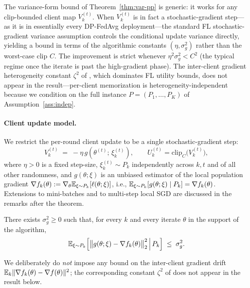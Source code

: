 The variance-form bound of Theorem~\ref{thm:var-pp} is generic: it works for any clip-bounded client map \(V_k^{(t)}\). When \(V_k^{(t)}\) is in fact a stochastic-gradient step---as it is in essentially every DP-FedAvg deployment---the standard FL stochastic-gradient variance assumption \citep[Assumption~3]{Bornstein2022SWIFT} controls the conditional update variance directly, yielding a bound in terms of the algorithmic constants \((\eta,\sigma_g^2)\) rather than the worst-case clip \(C\). The improvement is strict whenever \(\eta^2\sigma_g^2<C^2\) (the typical regime once the iterate is past the high-gradient phase). The inter-client gradient heterogeneity constant \(\zeta^2\) of \citet[Assumption~3]{Bornstein2022SWIFT}, which dominates FL utility bounds, does not appear in the result---per-client memorization is heterogeneity-independent because we condition on the full instance \(P=(P_1,\dots,P_K)\) of Assumption~\ref{ass:indep}.

\paragraph{Client update model.} We restrict the per-round client update to be a single stochastic-gradient step:
\begin{equation}\label{eq:sg-update}
V_k^{(t)} \;=\; -\eta\,g\!\left(\theta^{(t)};\,\xi_k^{(t)}\right),\qquad U_k^{(t)}=\mathrm{clip}_C\bigl(V_k^{(t)}\bigr),
\end{equation}
where \(\eta>0\) is a fixed step-size, \(\xi_k^{(t)}\sim P_k\) independently across \(k,t\) and of all other randomness, and \(g(\theta;\xi)\) is an unbiased estimator of the local population gradient \(\nabla f_k(\theta):=\nabla_\theta\mathbb{E}_{\xi\sim P_k}[\ell(\theta;\xi)]\), i.e., \(\mathbb{E}_{\xi\sim P_k}[g(\theta;\xi)\mid P_k]=\nabla f_k(\theta)\). Extensions to mini-batches and to multi-step local SGD are discussed in the remarks after the theorem.

\begin{assumption}\label{ass:sgv}
There exists \(\sigma_g^2\ge0\) such that, for every \(k\) and every iterate \(\theta\) in the support of the algorithm,
\[
\mathbb{E}_{\xi\sim P_k}\!\left[\bigl\|g(\theta;\xi)-\nabla f_k(\theta)\bigr\|_2^2\,\Big|\,P_k\right] \;\le\; \sigma_g^2.
\]
\end{assumption}

\noindent We deliberately do \emph{not} impose any bound on the inter-client gradient drift \(\mathbb{E}_k\|\nabla f_k(\theta)-\nabla f(\theta)\|^2\); the corresponding constant \(\zeta^2\) of \citet[Assumption~3]{Bornstein2022SWIFT} does not appear in the result below.

